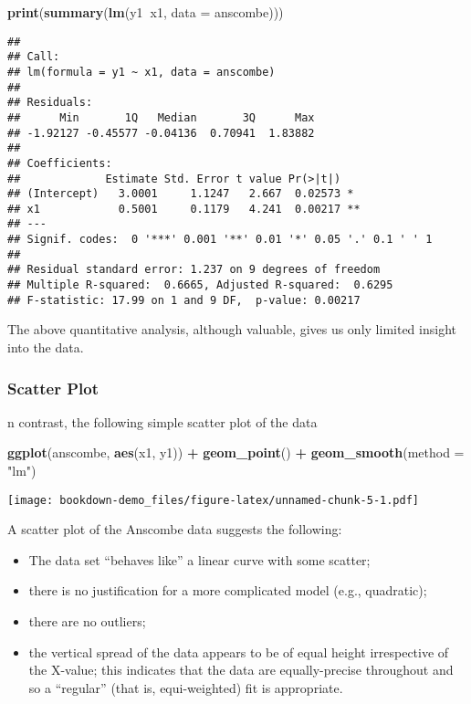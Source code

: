 \documentclass[]{book}
\newenvironment{Shaded}{\begin{snugshade}}{\end{snugshade}}
\newcommand{\KeywordTok}[1]{\textcolor[rgb]{0.13,0.29,0.53}{\textbf{#1}}}
\newcommand{\DataTypeTok}[1]{\textcolor[rgb]{0.13,0.29,0.53}{#1}}
\newcommand{\StringTok}[1]{\textcolor[rgb]{0.31,0.60,0.02}{#1}}
\newcommand{\OperatorTok}[1]{\textcolor[rgb]{0.81,0.36,0.00}{\textbf{#1}}}
\newcommand{\NormalTok}[1]{#1}
\providecommand{\tightlist}{%
  \setlength{\itemsep}{0pt}\setlength{\parskip}{0pt}}
\theoremstyle{definition}
\theoremstyle{definition}
\theoremstyle{definition}
\theoremstyle{remark}
\begin{document}
\begin{Shaded}
\begin{Highlighting}[]
\KeywordTok{print}\NormalTok{(}\KeywordTok{summary}\NormalTok{(}\KeywordTok{lm}\NormalTok{(y1}\OperatorTok{~}\NormalTok{x1, }\DataTypeTok{data =}\NormalTok{ anscombe)))}
\end{Highlighting}
\end{Shaded}

\begin{verbatim}
## 
## Call:
## lm(formula = y1 ~ x1, data = anscombe)
## 
## Residuals:
##      Min       1Q   Median       3Q      Max 
## -1.92127 -0.45577 -0.04136  0.70941  1.83882 
## 
## Coefficients:
##             Estimate Std. Error t value Pr(>|t|)   
## (Intercept)   3.0001     1.1247   2.667  0.02573 * 
## x1            0.5001     0.1179   4.241  0.00217 **
## ---
## Signif. codes:  0 '***' 0.001 '**' 0.01 '*' 0.05 '.' 0.1 ' ' 1
## 
## Residual standard error: 1.237 on 9 degrees of freedom
## Multiple R-squared:  0.6665, Adjusted R-squared:  0.6295 
## F-statistic: 17.99 on 1 and 9 DF,  p-value: 0.00217
\end{verbatim}

The above quantitative analysis, although valuable, gives us only
limited insight into the data.

\subsubsection{Scatter Plot}\label{scatter-plot}

n contrast, the following simple scatter plot of the data

\begin{Shaded}
\begin{Highlighting}[]
\KeywordTok{ggplot}\NormalTok{(anscombe, }\KeywordTok{aes}\NormalTok{(x1, y1)) }\OperatorTok{+}\StringTok{ }\KeywordTok{geom_point}\NormalTok{() }\OperatorTok{+}\StringTok{ }\KeywordTok{geom_smooth}\NormalTok{(}\DataTypeTok{method =} \StringTok{"lm"}\NormalTok{)}
\end{Highlighting}
\end{Shaded}

\texttt{[image: bookdown-demo\_files/figure-latex/unnamed-chunk-5-1.pdf]}

A scatter plot of the Anscombe data suggests the following:

\begin{itemize}
\tightlist
\item
  The data set ``behaves like'' a linear curve with some scatter;
\item
  there is no justification for a more complicated model (e.g.,
  quadratic);
\item
  there are no outliers;
\item
  the vertical spread of the data appears to be of equal height
  irrespective of the X-value; this indicates that the data are
  equally-precise throughout and so a ``regular'' (that is,
  equi-weighted) fit is appropriate.
\end{itemize}
\end{document}
